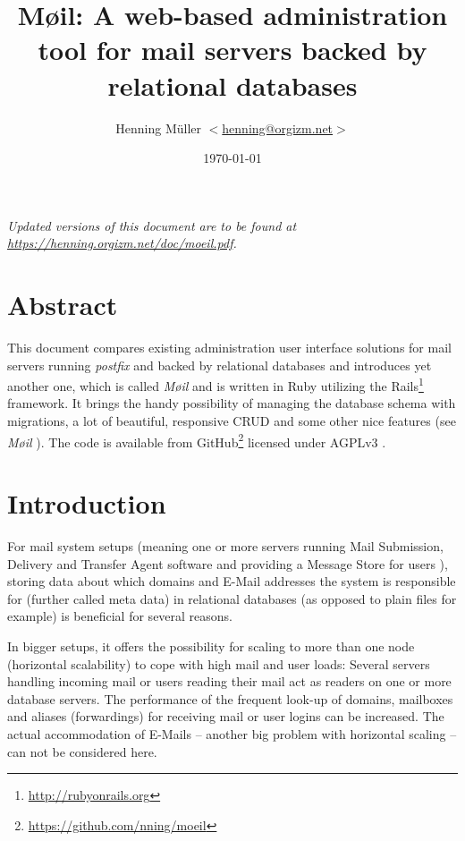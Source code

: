 \documentclass[12pt,a4paper]{scrartcl}
\begin{document}
	\title{Møil: A web-based administration tool for mail servers backed by relational databases}
	\author{Henning Müller $<$\href{mailto:henning@orgizm.net}{henning@orgizm.net}$>$}
	\date{\today}

	\maketitle

	\begin{center}
		\textit{Updated versions of this document are to be found at \\
			\url{https://henning.orgizm.net/doc/moeil.pdf}.}
	\end{center}

	\tableofcontents

	\section{Abstract}
		This document compares existing administration user interface solutions
		for mail servers running \emph{postfix} and backed by relational
		databases and introduces yet another one, which is called \emph{Møil}
		and is written in Ruby utilizing the
		\ac{Rails}\footnote{\url{http://rubyonrails.org}} framework. It brings
		the handy possibility of managing the database schema with migrations,
		a lot of beautiful, responsive \acs{CRUD} and some other nice features
		(see \emph{Møil} ). The code is available
		from GitHub\footnote{\url{https://github.com/nning/moeil}} licensed
		under AGPLv3 \cite{agpl}.

	\section{Introduction}

		For mail system setups (meaning one or more servers running Mail
		Submission, Delivery and Transfer Agent software and providing a
		Message Store for users \cite{mail-architecture}), storing data about
		which domains and E-Mail addresses the system is responsible for
		(further called meta data) in relational databases (as opposed to plain
		files for example) is beneficial for several reasons.


		In bigger setups, it offers the possibility for scaling to more than
		one node (horizontal scalability) to cope with high mail and user
		loads: Several servers handling incoming mail or users reading their
		mail act as readers on one or more database servers. The performance of
		the frequent look-up of domains, mailboxes and aliases (forwardings)
		for receiving mail or user logins can be increased. The actual
		accommodation of E-Mails -- another big problem with horizontal scaling
		-- can not be considered here.
\end{document}
